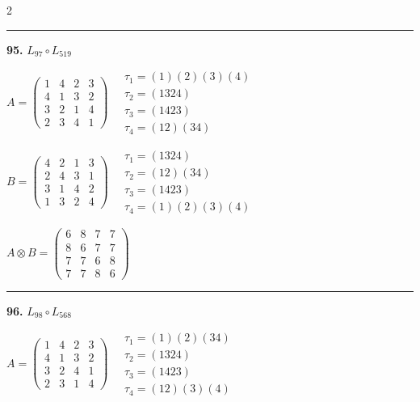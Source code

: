 \begin{multicols}{2}
\vspace{0.3em}
\hrule
\vspace{0.3em}

\noindent\textbf{95.} $L_{97} \circ L_{519}$

$A = \begin{pmatrix} 1 & 4 & 2 & 3 \\ 4 & 1 & 3 & 2 \\ 3 & 2 & 1 & 4 \\ 2 & 3 & 4 & 1 \end{pmatrix} \quad \begin{matrix} \tau_{1}=(1)(2)(3)(4) \\ \tau_{2}=(1 3 2 4) \\ \tau_{3}=(1 4 2 3) \\ \tau_{4}=(1 2)(3 4) \end{matrix}$

$B = \begin{pmatrix} 4 & 2 & 1 & 3 \\ 2 & 4 & 3 & 1 \\ 3 & 1 & 4 & 2 \\ 1 & 3 & 2 & 4 \end{pmatrix} \quad \begin{matrix} \tau_{1}=(1 3 2 4) \\ \tau_{2}=(1 2)(3 4) \\ \tau_{3}=(1 4 2 3) \\ \tau_{4}=(1)(2)(3)(4) \end{matrix}$

$A \otimes B = \begin{pmatrix} 6 & 8 & 7 & 7 \\ 8 & 6 & 7 & 7 \\ 7 & 7 & 6 & 8 \\ 7 & 7 & 8 & 6 \end{pmatrix}$

\vspace{0.3em}
\hrule
\vspace{0.3em}

\noindent\textbf{96.} $L_{98} \circ L_{568}$

$A = \begin{pmatrix} 1 & 4 & 2 & 3 \\ 4 & 1 & 3 & 2 \\ 3 & 2 & 4 & 1 \\ 2 & 3 & 1 & 4 \end{pmatrix} \quad \begin{matrix} \tau_{1}=(1)(2)(3 4) \\ \tau_{2}=(1 3 2 4) \\ \tau_{3}=(1 4 2 3) \\ \tau_{4}=(1 2)(3)(4) \end{matrix}$


\end{multicols}
